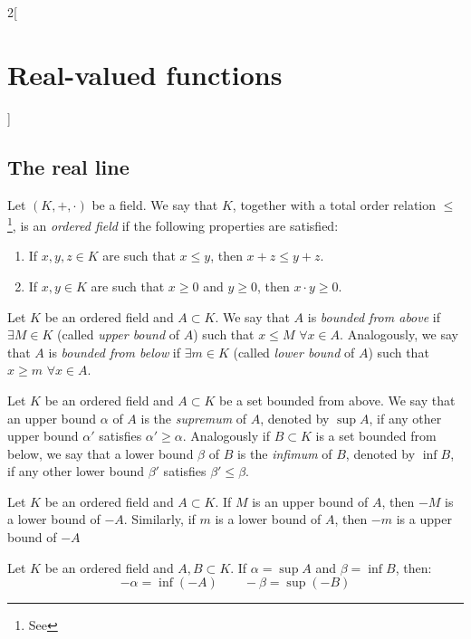 \documentclass[../../../main_math.tex]{subfiles}
\begin{document}
\renewcommand{\col}{\ana}
\begin{multicols}{2}[\section{Real-valued functions}]
  \subsection{The real line}
  \begin{definition}
    Let $(K,+,\cdot)$ be a field. We say that $K$, together with a total order relation $\leq$\footnote{See }, is an \emph{ordered field} if the following properties are satisfied:
    \begin{enumerate}
      \item If $x,y,z\in K$ are such that $x\leq y$, then $x+z\leq y+z$.
      \item If $x,y\in K$ are such that $x\geq0$ and $y\geq0$, then $x\cdot y\geq 0$.
    \end{enumerate}
  \end{definition}
  \begin{definition}
    Let $K$ be an ordered field and $A\subset K$. We say that $A$ is \emph{bounded from above} if $\exists M\in K$ (called \emph{upper bound} of $A$) such that $x\leq M$ $\forall x\in A$. Analogously, we say that $A$ is \emph{bounded from below} if $\exists m\in K$ (called \emph{lower bound} of $A$) such that $x\geq m$ $\forall x\in A$.
  \end{definition}
  \begin{definition}
    Let $K$ be an ordered field and $A\subset K$ be a set bounded from above. We say that an upper bound $\alpha$ of $A$ is the \emph{supremum} of $A$, denoted by $\sup A$, if any other upper bound $\alpha'$ satisfies $\alpha'\geq\alpha$.
    Analogously if $B\subset K$ is a set bounded from below, we say that a lower bound $\beta$ of $B$ is the \emph{infimum} of $B$, denoted by $\inf B$, if any other lower bound $\beta'$ satisfies $\beta'\leq\beta$.
  \end{definition}
  \begin{proposition}
    Let $K$ be an ordered field and $A\subset K$. If $M$ is an upper bound of $A$, then $-M$ is a lower bound of $-A$. Similarly, if $m$ is a lower bound of $A$, then $-m$ is a upper bound of $-A$
  \end{proposition}
  \begin{proposition}
    Let $K$ be an ordered field and $A,B\subset K$. If $\alpha=\sup A$ and $\beta=\inf B$, then: $$-\alpha=\inf(-A)\qquad-\beta=\sup(-B)$$

\end{proposition}
\end{multicols}
\end{document}
